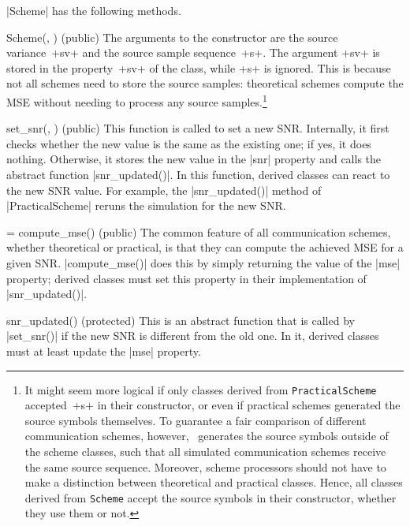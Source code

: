 |Scheme| has the following methods.
\begin{method}{Scheme(, ) (public)}
  The arguments to the constructor are the source
  variance~+sv+ and the source sample sequence~+s+. The argument +sv+ is
  stored in the property~+sv+ of the class, while +s+ is ignored. This
  is because not all schemes need to store the source samples: theoretical
  schemes compute the MSE without needing to process any source
  samples.\footnote{%
  It might seem more logical if only classes derived from
  \texttt{PracticalScheme} accepted~+s+ in their constructor, or even if
  practical schemes generated the source symbols themselves. To guarantee a
  fair comparison of different communication schemes, however, \jscsim\
  generates the source symbols outside of the scheme classes, such that all
  simulated communication schemes receive the same source sequence.
  Moreover, scheme processors should not have to make a distinction between
  theoretical and practical classes. Hence, all classes derived from
  \texttt{Scheme} accept the source symbols in their constructor, whether they
  use them or not.}
\end{method}

\begin{method}{set_snr(\obj, ) (public)}
  This function is called to set a new SNR.
  Internally, it first checks whether the new value is the same as the
  existing one; if yes, it does nothing. Otherwise, it stores the new value in
  the |snr| property and calls the abstract function |snr_updated()|. In this
  function, derived classes can react to the new SNR value. For example, the
  |snr_updated()| method of |PracticalScheme| reruns the simulation for the
  new SNR. 
\end{method}
  
\begin{method}{ = compute_mse(\obj) (public)}
  The common feature of all communication schemes, whether theoretical or
  practical, is that they can compute the achieved MSE for a given SNR.
  |compute_mse()| does this by simply returning the value of the |mse| property;
  derived classes must set this property in their implementation of
  |snr_updated()|.
\end{method}

\begin{method}{snr_updated(\obj) (protected)}
  This is an abstract function that is called by |set_snr()| if the new SNR is
  different from the old one. In it, derived classes must at least update the
  |mse| property. 
\end{method}


